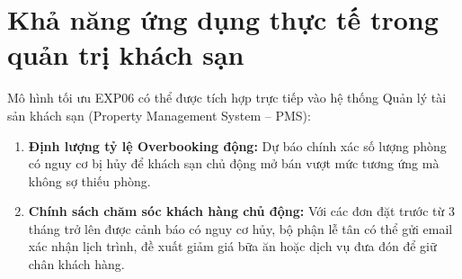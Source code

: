 \section{Khả năng ứng dụng thực tế trong quản trị khách sạn}
Mô hình tối ưu EXP06 có thể được tích hợp trực tiếp vào hệ thống Quản lý tài sản khách sạn (Property Management System -- PMS):
\begin{enumerate}
    \item \textbf{Định lượng tỷ lệ Overbooking động:} Dự báo chính xác số lượng phòng có nguy cơ bị hủy để khách sạn chủ động mở bán vượt mức tương ứng mà không sợ thiếu phòng.
    \item \textbf{Chính sách chăm sóc khách hàng chủ động:} Với các đơn đặt trước từ 3 tháng trở lên được cảnh báo có nguy cơ hủy, bộ phận lễ tân có thể gửi email xác nhận lịch trình, đề xuất giảm giá bữa ăn hoặc dịch vụ đưa đón để giữ chân khách hàng.
\end{enumerate}
